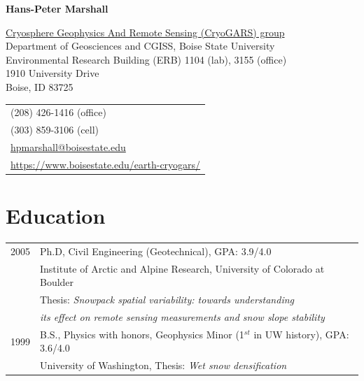 \documentclass[11pt]{article}
\def\name{Hans-Peter Marshall}
\begin{document}


\centerline{\Large \bf \name}

\vspace{0.25in}

\begin{minipage}{0.70\linewidth}
  \href{http://earth.boisestate.edu/cryogars/}{Cryosphere Geophysics And Remote Sensing (CryoGARS) group} \\
  Department of Geosciences and CGISS, Boise State University \\
  Environmental Research Building (ERB) 1104 (lab), 3155 (office) \\
  1910 University Drive \\
  Boise, ID  83725
\end{minipage}
\begin{minipage}{0.30\linewidth}
  \begin{tabular}{l}
     (208) 426-1416 (office) \\
     (303) 859-3106 (cell) \\
    \href{mailto:hpmarshall@boisestate.edu}{hpmarshall@boisestate.edu} \\
    \href{https://www.boisestate.edu/earth-cryogars/}{https://www.boisestate.edu/earth-cryogars/} \\
  \end{tabular}
\end{minipage}

\section*{Education}

\begin{tabular}{ll}
	2005 & Ph.D, Civil Engineering (Geotechnical), GPA: 3.9/4.0 \\
	          & Institute of Arctic and Alpine Research, University of Colorado at Boulder \\
		 & Thesis: \textit{Snowpack spatial variability: towards understanding} \\
                  &   \textit{its effect on remote sensing measurements and snow slope stability} \\
	1999 &  B.S., Physics with honors, Geophysics Minor (1$^{st}$ in UW history), GPA: 3.6/4.0 \\
	         &   University of Washington, Thesis: \textit{Wet snow densification} \\
\end{tabular}
\end{document}
